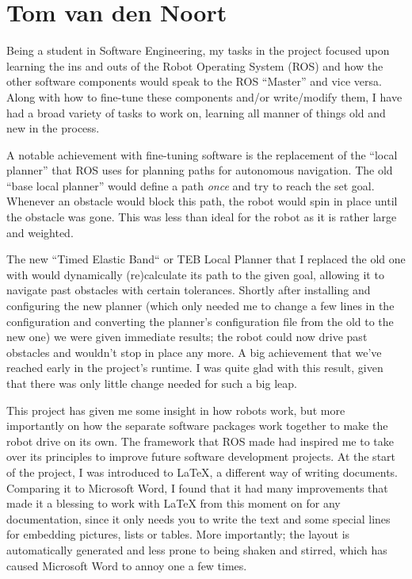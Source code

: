 \section{Tom van den Noort}

Being a student in Software Engineering, my tasks in the project focused upon learning the ins and outs of the Robot Operating System (ROS) and how the other software components would speak to the ROS ``Master'' and vice versa. Along with how to fine-tune these components and/or write/modify them, I have had a broad variety of tasks to work on, learning all manner of things old and new in the process.

\vspace{5mm}

A notable achievement with fine-tuning software is the replacement of the ``local planner'' that ROS uses for planning paths for autonomous navigation. The old ``base local planner'' would define a path \textit{once} and try to reach the set goal. Whenever an obstacle would block this path, the robot would spin in place until the obstacle was gone. This was less than ideal for the robot as it is rather large and weighted.

The new ``Timed Elastic Band`` or TEB Local Planner that I replaced the old one with would dynamically (re)calculate its path to the given goal, allowing it to navigate past obstacles with certain tolerances. Shortly after installing and configuring the new planner (which only needed me to change a few lines in the configuration and converting the planner's configuration file from the old to the new one) we were given immediate results; the robot could now drive past obstacles and wouldn't stop in place any more. A big achievement that we've reached early in the project's runtime. I was quite glad with this result, given that there was only little change needed for such a big leap.

\vspace{5mm}

This project has given me some insight in how robots work, but more importantly on how the separate software packages work together to make the robot drive on its own. The framework that ROS made had inspired me to take over its principles to improve future software development projects. 
At the start of the project, I was introduced to LaTeX, a different way of writing documents. Comparing it to Microsoft Word, I found that it had many improvements that made it a blessing to work with LaTeX from this moment on for any documentation, since it only needs you to write the text and some special lines for embedding pictures, lists or tables. More importantly; the layout is automatically generated and less prone to being shaken and stirred, which has caused Microsoft Word to annoy one a few times.

